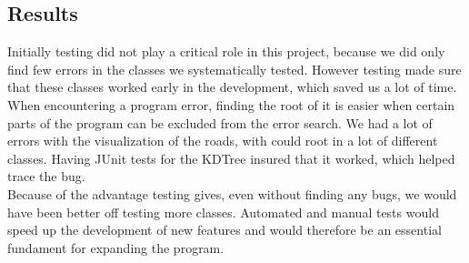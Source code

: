 \documentclass[a4paper,10pt,titlepage]{article}
\begin{document}
			
			
		\subsection{Results}
		Initially testing did not play a critical role in this project, because we did only find few errors in the classes we systematically tested. However testing made sure that these classes worked early in the development, which saved us a lot of time. When encountering a program error, finding the root of it is easier when certain parts of the program can be excluded from the error search. We had a lot of errors with the visualization of the roads, with could root in a lot of different classes. Having JUnit tests for the KDTree insured that it worked, which helped trace the bug.\\
		Because of the advantage testing gives, even without finding any bugs, we would have been better off testing more classes. Automated and manual tests would speed up the development of new features and would therefore be an essential fundament for expanding the program. 

			
	\newpage
\end{document}

